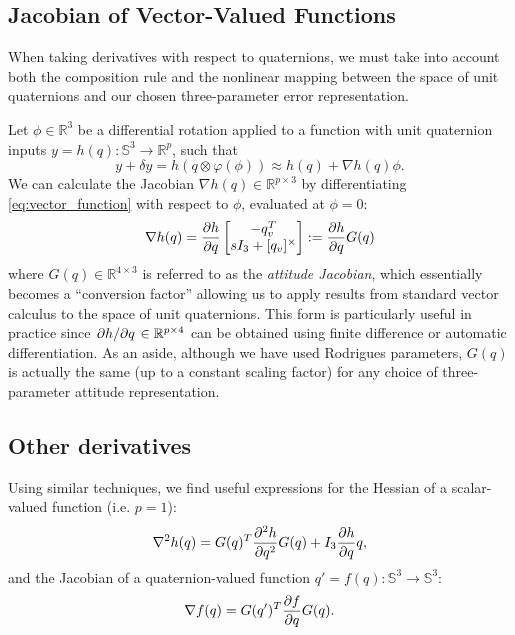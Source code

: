 \documentclass[letterpaper, 10 pt, conference]{ieeeconf}  %
\newcommand{\R}{\mathbb{R}}
\newcommand{\Q}{\mathbb{S}^3}
\newcommand{\skewmat}[1]{[#1]^\times}
\begin{document}
    \subsection{Jacobian of Vector-Valued Functions}
        When taking derivatives with respect to quaternions, we must take into account
        both the composition rule and the nonlinear mapping between the space of unit
        quaternions and our chosen three-parameter error representation.

        Let $\phi \in \R^3$ be a differential rotation applied to a function with
        unit quaternion inputs $y = h(q): \Q \to \R^p$, such that
        \begin{equation} \label{eq:vector_function}
            y + \delta y = h(q \otimes \varphi(\phi)) \approx h(q) +  \nabla h(q) \phi.
        \end{equation}
        We can calculate the Jacobian $\nabla h(q) \in \R^{p \times 3}$ by
        differentiating \eqref{eq:vector_function} with respect to $\phi$, evaluated at
        $\phi = 0$:
        \begin{equation} \label{eq:quat_gradient}
            \nabla h(q) = \pdv{h}{q} \begin{bmatrix} 
                            -q_v^T \\ 
                            sI_3 + \skewmat{q_v}
                        \end{bmatrix}
                        := \pdv{h}{q} G(q) 
        \end{equation}
        where $G(q) \in \R^{4 \times 3}$ is referred to as the \textit{attitude Jacobian}, which
        essentially becomes a ``conversion factor'' allowing us to apply results from
        standard vector calculus to the space of unit quaternions. This form is
        particularly useful in practice since $\pdv*{h}{q} \in \R^{p \times 4}$ can be
        obtained using finite difference or automatic differentiation.
        As an aside, although we have used Rodrigues parameters, $G(q)$ is actually the
        same (up to a constant scaling factor) for any choice of three-parameter attitude
        representation.

    \subsection{Other derivatives}
        Using similar techniques, we find useful expressions for the Hessian of a
        scalar-valued function (i.e. $p = 1$):
	    \begin{equation} \label{eq:quat_hessian}
            \nabla^2 h(q) = G(q)^T \pdv[2]{h}{q} G(q) + I_3 \pdv{h}{q}q,
        \end{equation}
        and the Jacobian of a quaternion-valued function $q' = f(q) : \Q \to \Q$:
        \begin{equation} \label{eq:quat_jacobian}
            \nabla f(q) = G(q')^T \pdv{f}{q} G(q).
        \end{equation}
\end{document}
